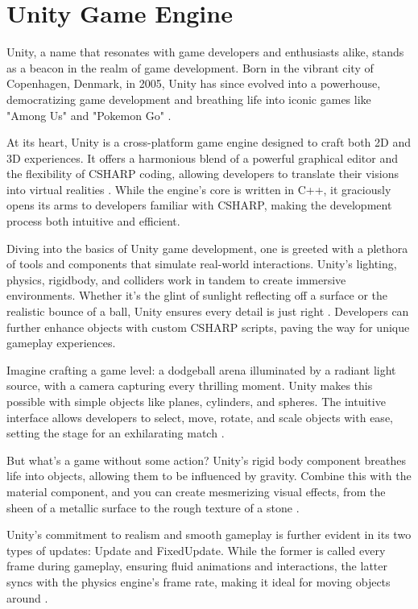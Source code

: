 \section{Unity Game Engine}

Unity, a name that resonates with game developers and enthusiasts alike, stands as a beacon in the realm of game development. Born in the vibrant city of Copenhagen, Denmark, in 2005, Unity has since evolved into a powerhouse, democratizing game development and breathing life into iconic games like "Among Us" and "Pokemon Go" \cite{unity100seconds}.

At its heart, Unity is a cross-platform game engine designed to craft both 2D and 3D experiences. It offers a harmonious blend of a powerful graphical editor and the flexibility of CSHARP coding, allowing developers to translate their visions into virtual realities \cite{unitymanual2021}. While the engine's core is written in C++, it graciously opens its arms to developers familiar with CSHARP, making the development process both intuitive and efficient.

Diving into the basics of Unity game development, one is greeted with a plethora of tools and components that simulate real-world interactions. Unity's lighting, physics, rigidbody, and colliders work in tandem to create immersive environments. Whether it's the glint of sunlight reflecting off a surface or the realistic bounce of a ball, Unity ensures every detail is just right \cite{goldstone2010}. Developers can further enhance objects with custom CSHARP scripts, paving the way for unique gameplay experiences.

Imagine crafting a game level: a dodgeball arena illuminated by a radiant light source, with a camera capturing every thrilling moment. Unity makes this possible with simple objects like planes, cylinders, and spheres. The intuitive interface allows developers to select, move, rotate, and scale objects with ease, setting the stage for an exhilarating match \cite{harrison2013}.

But what's a game without some action? Unity's rigid body component breathes life into objects, allowing them to be influenced by gravity. Combine this with the material component, and you can create mesmerizing visual effects, from the sheen of a metallic surface to the rough texture of a stone \cite{blackman2012}.

Unity's commitment to realism and smooth gameplay is further evident in its two types of updates: Update and FixedUpdate. While the former is called every frame during gameplay, ensuring fluid animations and interactions, the latter syncs with the physics engine's frame rate, making it ideal for moving objects around \cite{unityupdatefixedupdate}.

